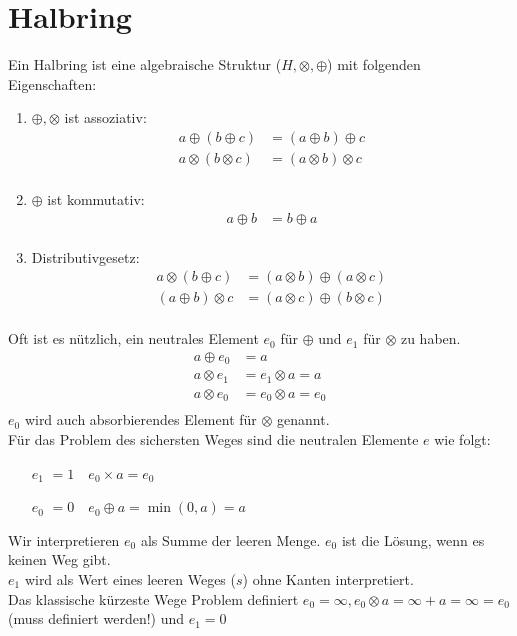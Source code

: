 \section{Halbring}
Ein Halbring ist eine algebraische Struktur ($H,\otimes , \oplus$) mit folgenden Eigenschaften:
\begin{enumerate}
\item $\oplus, \otimes$ ist assoziativ:\\
\begin{align*}
a \oplus (b \oplus c) &= (a \oplus b) \oplus c\\
a \otimes (b \otimes c) &= (a \otimes b) \otimes c\\
\end{align*}
\item $\oplus$ ist kommutativ:\\
\begin{align*}
a \oplus b &= b \oplus a\\
\end{align*}
\item Distributivgesetz:
\begin{align*}
a \otimes (b \oplus c) &= (a \otimes b) \oplus (a \otimes c)\\
(a \oplus b) \otimes c  &= (a \otimes c) \oplus (b \otimes c)\\
\end{align*}
\end{enumerate}

Oft ist es nützlich, ein neutrales Element $e_0$ für $\oplus$ und $e_1$ für $\otimes$ zu haben.\\
\begin{align*}
a \oplus e_0 &= a\\
a \otimes e_1 &= e_1 \otimes a = a\\
a \otimes e_0 &= e_0 \otimes a = e_0\\
\end{align*}
$e_0$ wird auch absorbierendes Element für $\otimes$ genannt.\\

Für das Problem des sichersten Weges sind die neutralen Elemente $e$ wie folgt:
\begin{enumerate}
\item[$e_1$] $=1\quad e_0 \times a = e_0$
\item[$e_0$] $=0 \quad e_0 \oplus a = \min(0,a) = a$
\end{enumerate}
Wir interpretieren $e_0$ als Summe der leeren Menge. $e_0$ ist die Lösung, wenn es keinen Weg gibt.\\
$e_1$ wird als Wert eines leeren Weges ($s$) ohne Kanten interpretiert.\\
Das klassische kürzeste Wege Problem definiert $e_0 = \infty, e_0 \otimes a = \infty + a = \infty = e_0$(muss definiert werden!) und $e_1 = 0$\\

